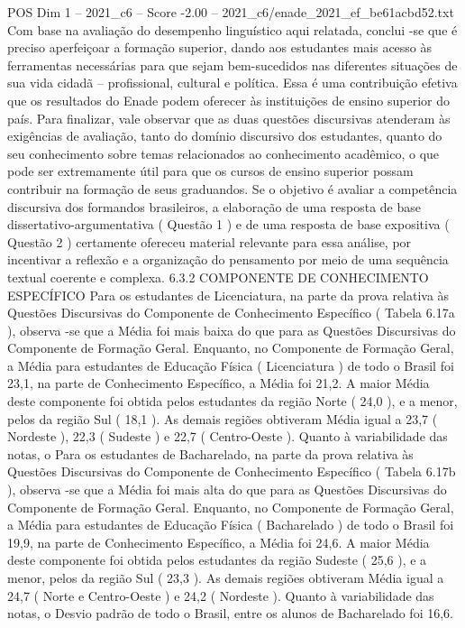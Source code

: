 \begin{textsample}{POS Dim 1 – 2021\_c6 – Score -2.00 – 2021\_c6/enade\_2021\_ef\_be61acbd52.txt}
Com base na avaliação do desempenho linguístico aqui relatada, conclui -se que é preciso aperfeiçoar a formação superior, dando aos estudantes mais acesso às ferramentas necessárias para que sejam bem-sucedidos nas diferentes situações de sua vida cidadã – profissional, cultural e política.
Essa é uma contribuição efetiva que os resultados do Enade podem oferecer às instituições de ensino superior do país.
Para finalizar, vale observar que as duas questões discursivas atenderam às exigências de avaliação, tanto do domínio discursivo dos estudantes, quanto do seu conhecimento sobre temas relacionados ao conhecimento acadêmico, o que pode ser extremamente útil para que os cursos de ensino superior possam contribuir na formação de seus graduandos.
Se o objetivo é avaliar a competência discursiva dos formandos brasileiros, a elaboração de uma resposta de base dissertativo-argumentativa ( Questão 1 ) e de uma resposta de base expositiva ( Questão 2 ) certamente ofereceu material relevante para essa análise, por incentivar a reflexão e a organização do pensamento por meio de uma sequência textual coerente e complexa. 6.3.2 COMPONENTE DE CONHECIMENTO ESPECÍFICO Para os estudantes de Licenciatura, na parte da prova relativa às Questões Discursivas do Componente de Conhecimento Específico ( Tabela 6.17a ), observa -se que a Média foi mais baixa do que para as Questões Discursivas do Componente de Formação Geral.
Enquanto, no Componente de Formação Geral, a Média para estudantes de Educação Física ( Licenciatura ) de todo o Brasil foi 23,1, na parte de Conhecimento Específico, a Média foi 21,2.
A maior Média deste componente foi obtida pelos estudantes da região Norte ( 24,0 ), e a menor, pelos da região Sul ( 18,1 ).
As demais regiões obtiveram Média igual a 23,7 ( Nordeste ), 22,3 ( Sudeste ) e 22,7 ( Centro-Oeste ).
Quanto à variabilidade das notas, o Para os estudantes de Bacharelado, na parte da prova relativa às Questões Discursivas do Componente de Conhecimento Específico ( Tabela 6.17b ), observa -se que a Média foi mais alta do que para as Questões Discursivas do Componente de Formação Geral.
Enquanto, no Componente de Formação Geral, a Média para estudantes de Educação Física ( Bacharelado ) de todo o Brasil foi 19,9, na parte de Conhecimento Específico, a Média foi 24,6.
A maior Média deste componente foi obtida pelos estudantes da região Sudeste ( 25,6 ), e a menor, pelos da região Sul ( 23,3 ).
As demais regiões obtiveram Média igual a 24,7 ( Norte e Centro-Oeste ) e 24,2 ( Nordeste ).
Quanto à variabilidade das notas, o Desvio padrão de todo o Brasil, entre os alunos de Bacharelado foi 16,6.

\end{textsample}
